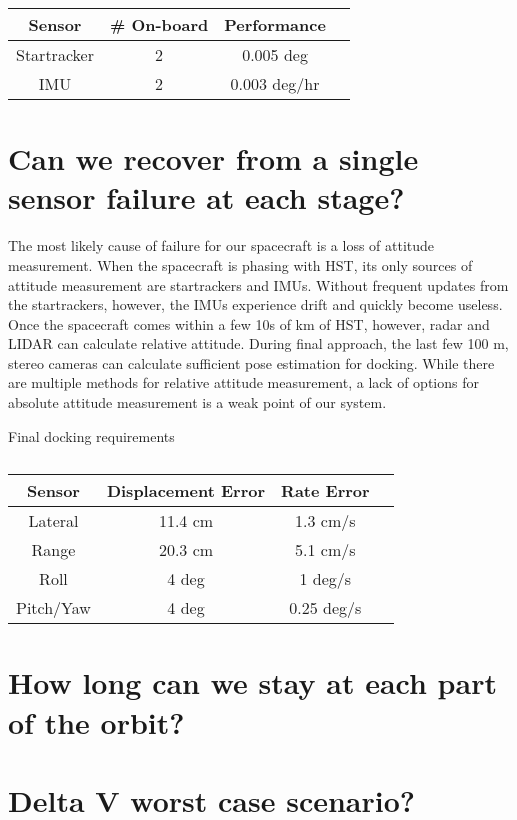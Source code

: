 \documentclass[onecolumn,10pt]{jhwhw}
\begin{document}
\begin{table}[t!]
\begin{center}
\begin{tabular}{c c c c}
\toprule
Sensor & \# On-board & Performance \\
\midrule
Startracker  & 2 & 0.005 deg \\
IMU          & 2 & 0.003 deg/hr \\
\bottomrule
\end{tabular}
\end{center}
\caption{}
\end{table}

\section{Can we recover from a single sensor failure at each stage?}

The most likely cause of failure for our spacecraft is a loss of attitude measurement. When the spacecraft is phasing with HST, its only sources of attitude measurement are startrackers and IMUs. Without frequent updates from the startrackers, however, the IMUs experience drift and quickly become useless. Once the spacecraft comes within a few 10s of km of HST, however, radar and LIDAR can calculate relative attitude. During final approach, the last few 100 m, stereo cameras can calculate sufficient pose estimation for docking. While there are multiple methods for relative attitude measurement, a lack of options for absolute attitude measurement is a weak point of our system.

Final docking requirements

\begin{table}[t!]
\begin{center}
\begin{tabular}{c c c c}
\toprule
Sensor & Displacement Error & Rate Error \\
\midrule
Lateral   & 11.4 cm & 1.3 cm/s \\
Range     & 20.3 cm & 5.1 cm/s \\
Roll      & 4 deg   & 1 deg/s \\
Pitch/Yaw & 4 deg   & 0.25 deg/s \\
\bottomrule
\end{tabular}
\end{center}
\caption{}
\end{table}


\section{How long can we stay at each part of the orbit?}
\section{Delta V worst case scenario?}
\end{document}
